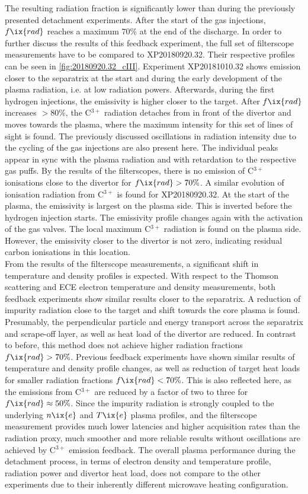                 The resulting radiation fraction is significantly lower than during the previously presented detachment experiments. After the start of the gas injections, $f\ix{rad}$ reaches a maximum 70\% at the end of the discharge. In order to further discuss the results of this feedback experiment, the full set of filterscope measurements have to be compared to XP20180920.32. Their respective profiles can be seen in \cref{fig:20180920.32_cIII}. Experiment XP20181010.32 shows emission closer to the separatrix at the start and during the early development of the plasma radiation, i.e. at low radiation powers. Afterwards, during the first hydrogen injections, the emissivity is higher closer to the target. After $f\ix{rad}$ increases $>80\%$, the C$^{3+}$ radiation detaches from in front of the divertor and moves towards the plasma, where the maximum intensity for this set of lines of sight is found. The previously discussed oscillations in radiation intensity due to the cycling of the gas injections are also present here. The individual peaks appear in sync with the plasma radiation and with retardation to the respective gas puffs. By the results of the filterscopes, there is no emission of C$^{3+}$ ionisations close to the divertor for $f\ix{rad}>70\%$. A similar evolution of ionisation radiation from C$^{3+}$ is found for XP20180920.32. At the start of the plasma, the emissivity is largest on the plasma side. This is inverted before the hydrogen injection starts. The emissivity profile changes again with the activation of the gas valves. The local maximum C$^{3+}$ radiation is found on the plasma side. However, the emissivity closer to the divertor is not zero, indicating residual carbon ionisations in this location.\\%
                From the results of the filterscope measurements, a significant shift in temperature and density profiles is expected. With respect to the Thomson scattering and ECE electron temperature and density measurements, both feedback experiments show similar results closer to the separatrix. A reduction of impurity radiation close to the target and shift towards the core plasma is found. Presumably, the perpendicular particle and energy transport across the separatrix and scrape-off layer, as well as heat load of the divertor are reduced. In contrast to before, this method does not achieve higher radiation fractions $f\ix{rad}>70\%$. Previous feedback experiments have shown similar results of temperature and density profile changes, as well as reduction of target heat loads for smaller radiation fractions $f\ix{rad}<70\%$. This is also reflected here, as the emissions from C$^{3+}$ are reduced by a factor of two to three for $f\ix{rad}\approx50\%$. Since the impurity radiation is strongly coupled to the underlying $n\ix{e}$ and $T\ix{e}$ plasma profiles, and the filterscope measurement provides much lower latencies and higher acquisition rates than the radiation proxy, much smoother and more reliable results without oscillations are achieved by C$^{3+}$ emission feedback. The overall plasma performance during the detachment process, in terms of electron density and temperature profile, radiation power and divertor heat load, does not compare to the other experiments due to their inherently different microwave heating configuration\cite{Erckmann2007}.%
%
